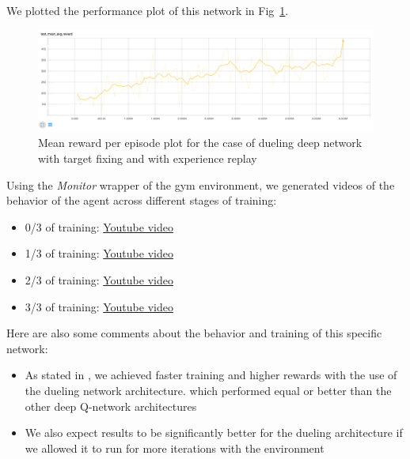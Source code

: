 \documentclass{article}
\begin{document}
We plotted the performance plot of this network in Fig~\ref{fig:r_q7}.


\begin{figure}[ht] 
  \centering
  \label{fig:r_q7}
  \includegraphics[width=1.0\textwidth]{images/r_q7}
  \caption{Mean reward per episode plot for the case of dueling deep network with target fixing and with experience replay}
\end{figure}

Using the \textit{Monitor} wrapper of the gym environment, we generated videos of the behavior of the agent across different stages of training:

\begin{itemize}
  \item 0/3 of training: \href{https://youtu.be/TYlwYw5Xfgcm}{Youtube video}
  \item 1/3 of training: \href{https://youtu.be/j5yEKPD1qms}{Youtube video}
  \item 2/3 of training: \href{https://youtu.be/B_zpHyC6Vus}{Youtube video}
  \item 3/3 of training: \href{https://youtu.be/tQ2TG76iQ0U}{Youtube video}
\end{itemize}

Here are also some comments about the behavior and training of this specific network:

\begin{itemize}
  \item As stated in \cite{wang2015dueling}, we achieved faster training and higher rewards with the use of the dueling network architecture. which performed equal or better than the other deep Q-network architectures
  \item We also expect results to be significantly better for the dueling architecture if we allowed it to run for more iterations with the environment
\end{itemize}
\end{document}
